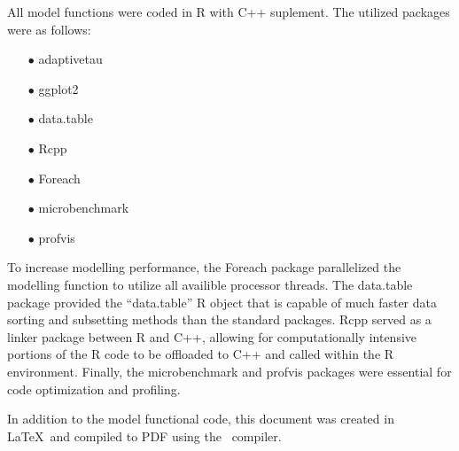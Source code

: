 \documentclass[../Paper.tex]{subfiles}
\begin{document}
\justifying
All model functions were coded in R\cite{R} with {C++} suplement.
The utilized packages were as follows:
\begin{enumerate}
  \item[$\bullet$]{adaptivetau\cite{johnson_2016}}
  \item[$\bullet$]{ggplot2\cite{Wickham_2009}}
  \item[$\bullet$]{data.table\cite{data.table}}
  \item[$\bullet$]{Rcpp\cite{Rcpp}}
  \item[$\bullet$]{Foreach\cite{foreach}}
  \item[$\bullet$]{microbenchmark\cite{microbenchmark}}
  \item[$\bullet$]{profvis\cite{profvis}}
\end{enumerate}
To increase modelling performance, the Foreach package parallelized the modelling
function to utilize all availible processor threads. The data.table package provided
the ``data.table'' R object that is capable of much faster data sorting and
subsetting methods than the standard packages. Rcpp served as a linker package
between R and {C++}, allowing for computationally intensive portions of the R code
to be offloaded to {C++} and called within the R environment.
Finally, the microbenchmark and profvis packages were essential for code
optimization and profiling.

In addition to the model functional code, this document was created in \LaTeX\
and compiled to PDF using the \XeLaTeX\  compiler.
\clearpage
\end{document}
